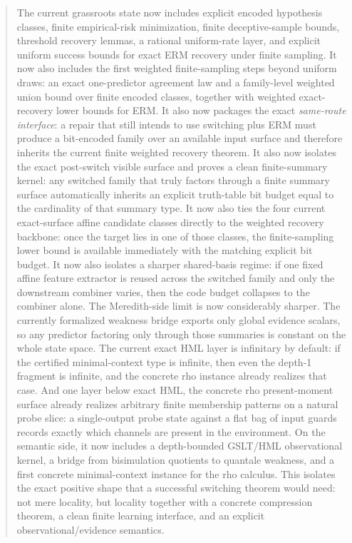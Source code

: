 \documentclass[11pt]{article}
\theoremstyle{remark}
\begin{document}
\begin{abstract}
The current grassroots state now includes explicit encoded hypothesis classes,
finite empirical-risk minimization, finite deceptive-sample bounds, threshold
recovery lemmas, a rational uniform-rate layer, and explicit uniform success
bounds for exact ERM recovery under finite sampling.  It now also includes the
first weighted finite-sampling steps beyond uniform draws: an exact
one-predictor agreement law and a family-level weighted union bound over finite
encoded classes, together with weighted exact-recovery lower bounds for ERM.
It also now packages the exact \emph{same-route interface}: a repair that still
intends to use switching plus ERM must produce a bit-encoded family over an
available input surface and therefore inherits the current finite weighted
recovery theorem.
It also now isolates the exact post-switch visible surface and proves a clean
finite-summary kernel: any switched family that truly factors through a finite
summary surface automatically inherits an explicit truth-table bit budget equal
to the cardinality of that summary type.
It now also ties the four current exact-surface affine candidate classes
directly to the weighted recovery backbone: once the target lies in one of
those classes, the finite-sampling lower bound is available immediately with the
matching explicit bit budget.
It now also isolates a sharper shared-basis regime: if one fixed affine feature
extractor is reused across the switched family and only the downstream combiner
varies, then the code budget collapses to the combiner alone.
The Meredith-side limit is now considerably sharper.  The currently formalized
weakness bridge exports only global evidence scalars, so any predictor factoring
only through those summaries is constant on the whole state space.  The current
exact HML layer is infinitary by default: if the certified minimal-context type
is infinite, then even the depth-1 fragment is infinite, and the concrete rho
instance already realizes that case.  And one layer below exact HML, the
concrete rho present-moment surface already realizes arbitrary finite
membership patterns on a natural probe slice: a single-output probe state
against a flat bag of input guards records exactly which channels are present in
the environment.
On the semantic side, it now includes a depth-bounded GSLT/HML observational
kernel, a bridge from bisimulation quotients to quantale weakness, and a first
concrete minimal-context instance for the rho calculus.  This isolates the exact
positive shape that a successful switching theorem would need: not mere
locality, but locality together with a concrete compression theorem, a clean
finite learning interface, and an explicit observational/evidence semantics.
\end{abstract}
\end{document}
